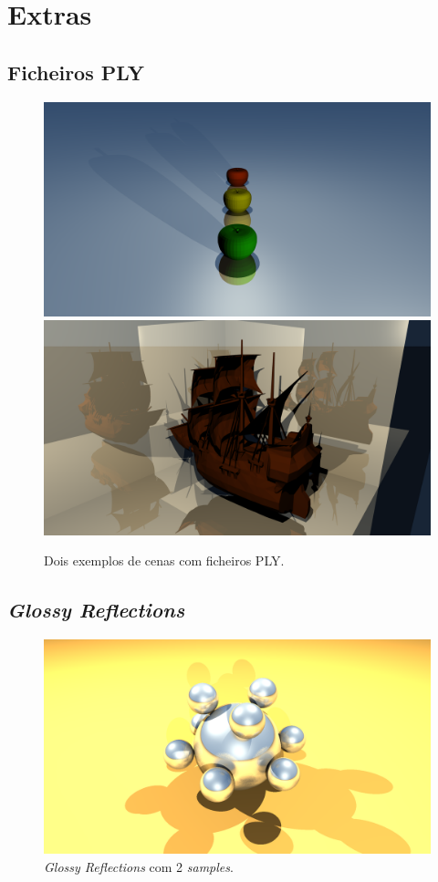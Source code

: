 \documentclass{article}
\begin{document}
    \section*{Extras}  
        \subsection*{Ficheiros PLY}
            \par

            \begin{figure}[h!]
                \centering
                \includegraphics[scale=0.122]{apple}
                \includegraphics[scale=0.122]{boat}
                \caption{Dois exemplos de cenas com ficheiros PLY.}
            \end{figure} 

        \subsection*{\textit{Glossy Reflections}}  
            \par

            \begin{figure}[h!]
                \centering
                \includegraphics[scale=0.122]{glrefl}
                \caption{\textit{Glossy Reflections} com 2 \textit{samples}.}
            \end{figure}
\end{document}
